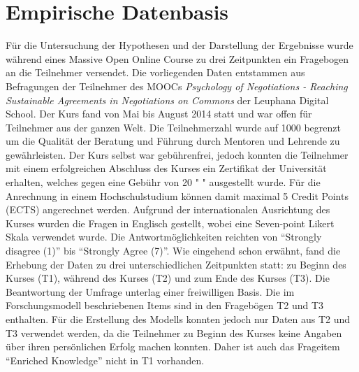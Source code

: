 \section{Empirische Datenbasis}
\label{sec:emp_daten}

Für die Untersuchung der Hypothesen und der Darstellung der Ergebnisse wurde während eines Massive Open Online Course zu drei Zeitpunkten ein Fragebogen an die Teilnehmer versendet.
\newline
 Die vorliegenden Daten entstammen aus Befragungen der Teilnehmer des MOOCs  \textit{Psychology of Negotiations - Reaching Sustainable Agreements in Negotiations on Commons}  der Leuphana Digital School. Der Kurs fand von Mai bis August 2014 statt und war offen für Teilnehmer aus der ganzen Welt. Die Teilnehmerzahl wurde auf 1000 begrenzt um die Qualität der Beratung und Führung durch Mentoren und Lehrende zu gewährleisten. Der Kurs selbst war gebührenfrei, jedoch konnten die Teilnehmer mit einem erfolgreichen Abschluss des Kurses ein Zertifikat der Universität erhalten, welches gegen eine Gebühr von 20 \texteuro " " ausgestellt wurde. Für die Anrechnung in einem Hochschulstudium können damit maximal 5 Credit Points (ECTS) angerechnet werden. Aufgrund der internationalen Ausrichtung des Kurses wurden die Fragen in Englisch gestellt, wobei eine Seven-point Likert Skala verwendet wurde. Die Antwortmöglichkeiten reichten von "`Strongly disagree (1)"' bis "`Strongly Agree (7)"'. Wie eingehend schon erwähnt, fand die Erhebung der Daten zu drei unterschiedlichen Zeitpunkten statt: zu Beginn des Kurses (T1), während des Kurses (T2) und zum Ende des Kurses (T3). Die Beantwortung der Umfrage unterlag einer freiwilligen Basis. Die im Forschungsmodell beschriebenen Items sind in den Fragebögen T2 und T3 enthalten.
Für die Erstellung des Modells konnten jedoch nur Daten aus T2 und T3 verwendet werden, da die Teilnehmer zu Beginn des Kurses keine Angaben über ihren persönlichen Erfolg machen konnten. Daher ist auch das Frageitem "`Enriched Knowledge"' nicht in T1 vorhanden.  
 

